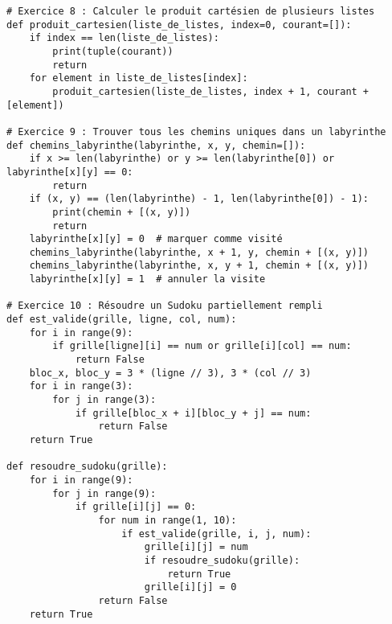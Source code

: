 \begin{lstlisting}
# Exercice 8 : Calculer le produit cartésien de plusieurs listes
def produit_cartesien(liste_de_listes, index=0, courant=[]):
    if index == len(liste_de_listes):
        print(tuple(courant))
        return
    for element in liste_de_listes[index]:
        produit_cartesien(liste_de_listes, index + 1, courant + [element])

# Exercice 9 : Trouver tous les chemins uniques dans un labyrinthe
def chemins_labyrinthe(labyrinthe, x, y, chemin=[]):
    if x >= len(labyrinthe) or y >= len(labyrinthe[0]) or labyrinthe[x][y] == 0:
        return
    if (x, y) == (len(labyrinthe) - 1, len(labyrinthe[0]) - 1):
        print(chemin + [(x, y)])
        return
    labyrinthe[x][y] = 0  # marquer comme visité
    chemins_labyrinthe(labyrinthe, x + 1, y, chemin + [(x, y)])
    chemins_labyrinthe(labyrinthe, x, y + 1, chemin + [(x, y)])
    labyrinthe[x][y] = 1  # annuler la visite

# Exercice 10 : Résoudre un Sudoku partiellement rempli
def est_valide(grille, ligne, col, num):
    for i in range(9):
        if grille[ligne][i] == num or grille[i][col] == num:
            return False
    bloc_x, bloc_y = 3 * (ligne // 3), 3 * (col // 3)
    for i in range(3):
        for j in range(3):
            if grille[bloc_x + i][bloc_y + j] == num:
                return False
    return True

def resoudre_sudoku(grille):
    for i in range(9):
        for j in range(9):
            if grille[i][j] == 0:
                for num in range(1, 10):
                    if est_valide(grille, i, j, num):
                        grille[i][j] = num
                        if resoudre_sudoku(grille):
                            return True
                        grille[i][j] = 0
                return False
    return True
\end{lstlisting}
